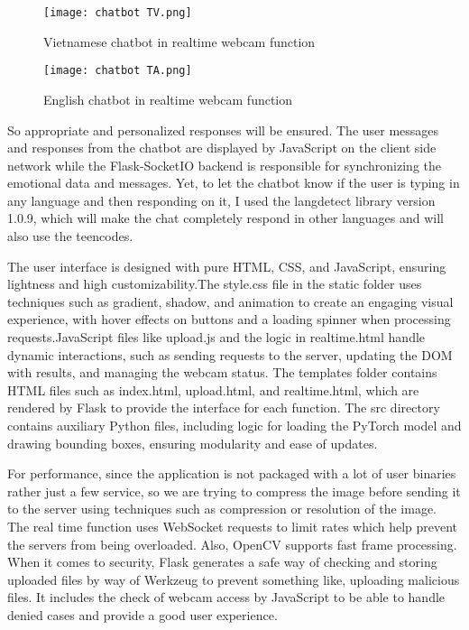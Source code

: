 \documentclass[a4paper,13pt]{report}
\begin{document}
\begin{figure}[H]
  \centering
  \texttt{[image: chatbot TV.png]}
  \caption{Vietnamese chatbot in realtime webcam function}
  \label{fig:method}
\end{figure}

\begin{figure}[H]
  \centering
  \texttt{[image: chatbot TA.png]}
  \caption{English chatbot in realtime webcam function}
  \label{fig:method}
\end{figure}

So appropriate and personalized responses will be ensured. The user messages and responses from the chatbot are displayed by JavaScript on the client side network while the Flask-SocketIO backend is responsible for synchronizing the emotional data and messages. Yet, to let the chatbot know if the user is typing in any language and then responding on it, I used the langdetect library version 1.0.9, which will make the chat completely respond in other languages and will also use the teencodes.

\newpage The user interface is designed with pure HTML, CSS, and JavaScript, ensuring lightness and high customizability.The style.css file in the static folder uses techniques such as gradient, shadow, and animation to create an engaging visual experience, with hover effects on buttons and a loading spinner when processing requests.JavaScript files like upload.js and the logic in realtime.html handle dynamic interactions, such as sending requests to the server, updating the DOM with results, and managing the webcam status. The templates folder contains HTML files such as index.html, upload.html, and realtime.html, which are rendered by Flask to provide the interface for each function. The src directory contains auxiliary Python files, including logic for loading the PyTorch model and drawing bounding boxes, ensuring modularity and ease of updates.

For performance, since the application is not packaged with a lot of user binaries rather just a few service, so we are trying to compress the image before sending it to the server using techniques such as compression or resolution of the image. The real time function uses WebSocket requests to limit rates which help prevent the servers from being overloaded. Also, OpenCV supports fast frame processing. When it comes to security, Flask generates a safe way of checking and storing uploaded files by way of Werkzeug to prevent something like, uploading malicious files. It includes the check of webcam access by JavaScript to be able to handle denied cases and provide a good user experience.
\end{document}
